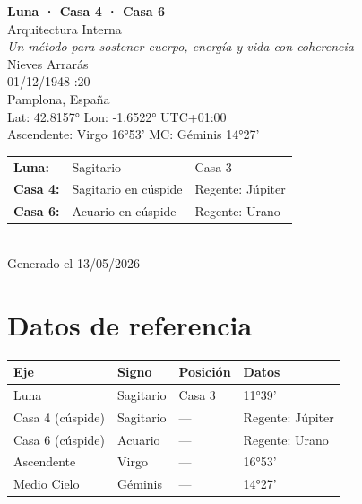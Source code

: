 \documentclass[11pt,a4paper]{article}
\begin{document}
\begin{titlepage}
  \centering
  \vspace*{1.5cm}
  {\Huge\bfseries\color{azulai} Luna · Casa 4 · Casa 6}\\[0.5cm]
  {\large\color{grisai} Arquitectura Interna}\\[0.3cm]
  {\small\itshape\color{grisai} Un método para sostener cuerpo, energía y vida con coherencia}\\[2cm]
  {\huge\color{doradoai} Nieves Arrarás}\\[1.5cm]
  {\Large 01/12/1948 :20}\\[0.3cm]
  {\Large Pamplona, España}\\[0.3cm]
  {\normalsize Lat: 42.8157° \quad Lon: -1.6522° \quad UTC+01:00}\\[0.3cm]
  {\normalsize Ascendente: Virgo 16°53' \quad
    MC: Géminis 14°27'}\\[2cm]

  \begin{tabular}{lll}
    \textbf{Luna:} & Sagitario & Casa 3 \\
    \textbf{Casa 4:} & Sagitario en cúspide & Regente: Júpiter \\
    \textbf{Casa 6:} & Acuario en cúspide & Regente: Urano \\
  \end{tabular}\\[2cm]

  \vfill
  {\small Generado el 13/05/2026}
\end{titlepage}

\tableofcontents
\clearpage

\section{Datos de referencia}

\begin{center}
\begin{tabular}{llll}
  \toprule
  \textbf{Eje} & \textbf{Signo} & \textbf{Posición} & \textbf{Datos} \\
  \midrule
  Luna & Sagitario & Casa 3 & 11°39' \\
  Casa 4 (cúspide) & Sagitario & --- & Regente: Júpiter \\
  Casa 6 (cúspide) & Acuario & --- & Regente: Urano \\
  Ascendente & Virgo & --- & 16°53' \\
  Medio Cielo & Géminis & --- & 14°27' \\
  \bottomrule
\end{tabular}
\end{center}
\end{document}
